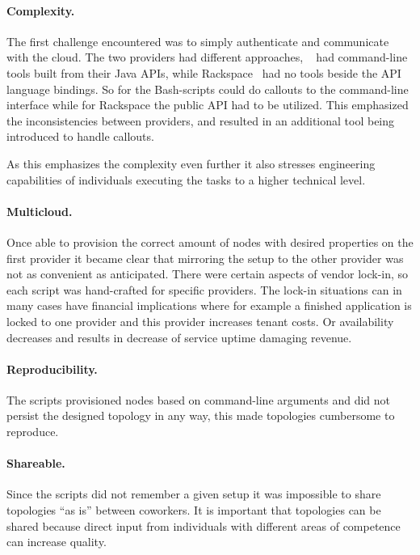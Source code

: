 \paragraph{Complexity.} 

The first challenge encountered was to simply 
authenticate and communicate with the cloud. 
The two providers had different approaches, ~\cite{aws} 
had command-line tools built from their Java APIs,
while Rackspace~\cite{rackspace} had no tools beside the API language bindings.
So for  the Bash-scripts could do callouts to the command-line interface 
while for Rackspace the public  API had to be utilized.
This emphasized the inconsistencies between providers, 
and resulted in an additional tool being introduced to handle callouts.

As this emphasizes the complexity even further it also stresses engineering capabilities
of individuals executing the tasks to a higher technical level.

\paragraph{Multicloud.}

Once able to provision the correct amount of nodes with desired properties
on the first provider it became clear that mirroring the setup to the other provider 
was not as convenient as anticipated.
There were certain aspects of vendor lock-in, so each script was hand-crafted for specific providers.
The lock-in situations can in many cases have financial implications where for example
a finished application is locked to one provider and this provider increases tenant costs.
Or availability decreases and results in decrease of service uptime damaging revenue.

\paragraph{Reproducibility.}

The scripts provisioned nodes based on command-line arguments
and did not persist the designed topology in any way, this made topologies cumbersome to reproduce.

\paragraph{Shareable.}

Since the scripts did not remember a given setup it was impossible 
to share topologies ``as is'' between coworkers.
It is important that topologies can be shared because direct input from individuals
with different areas of competence can increase quality.

